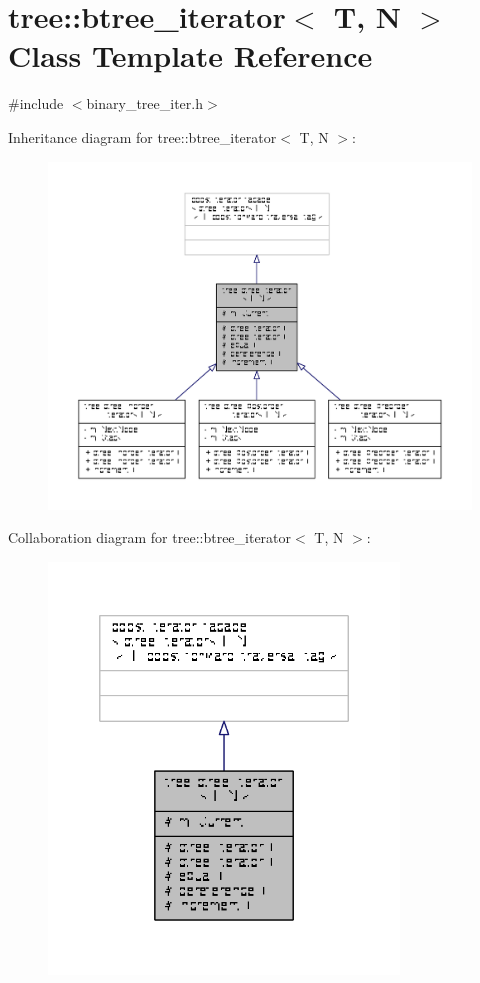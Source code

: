 \hypertarget{classtree_1_1btree__iterator}{\section{tree\-:\-:btree\-\_\-iterator$<$ T, N $>$ Class Template Reference}
\label{classtree_1_1btree__iterator}
}


{\ttfamily \#include $<$binary\-\_\-tree\-\_\-iter.\-h$>$}



Inheritance diagram for tree\-:\-:btree\-\_\-iterator$<$ T, N $>$\-:
\nopagebreak
\begin{figure}[H]
\begin{center}
\leavevmode
\includegraphics[width=350pt]{classtree_1_1btree__iterator__inherit__graph}
\end{center}
\end{figure}


Collaboration diagram for tree\-:\-:btree\-\_\-iterator$<$ T, N $>$\-:
\nopagebreak
\begin{figure}[H]
\begin{center}
\leavevmode
\includegraphics[width=264pt]{classtree_1_1btree__iterator__coll__graph}
\end{center}
\end{figure}
